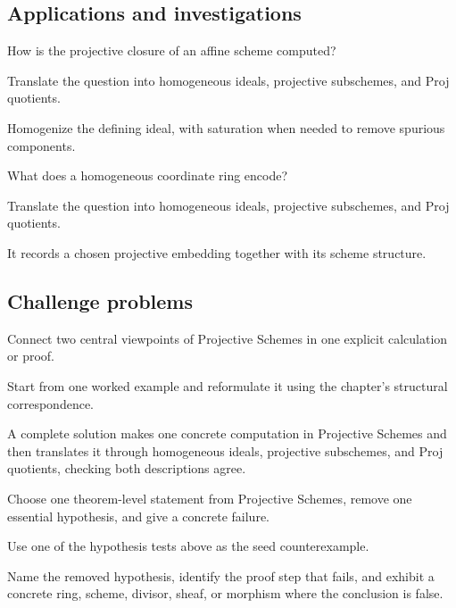 \subsection*{Applications and investigations}

\begin{exercise}\label{exr:vi37-expand-13}
How is the projective closure of an affine scheme computed?
\end{exercise}
\begin{hint}
Translate the question into homogeneous ideals, projective subschemes, and Proj quotients.
\end{hint}
\begin{solution}
Homogenize the defining ideal, with saturation when needed to remove spurious components.
\end{solution}

\begin{exercise}\label{exr:vi37-expand-14}
What does a homogeneous coordinate ring encode?
\end{exercise}
\begin{hint}
Translate the question into homogeneous ideals, projective subschemes, and Proj quotients.
\end{hint}
\begin{solution}
It records a chosen projective embedding together with its scheme structure.
\end{solution}

\subsection*{Challenge problems}

\begin{exercise}\label{exr:vi37-expand-15}
Connect two central viewpoints of Projective Schemes in one explicit calculation or proof.
\end{exercise}
\begin{hint}
Start from one worked example and reformulate it using the chapter's structural correspondence.
\end{hint}
\begin{solution}
A complete solution makes one concrete computation in Projective Schemes and then translates it through homogeneous ideals, projective subschemes, and Proj quotients, checking both descriptions agree.
\end{solution}

\begin{exercise}\label{exr:vi37-expand-16}
Choose one theorem-level statement from Projective Schemes, remove one essential hypothesis, and give a concrete failure.
\end{exercise}
\begin{hint}
Use one of the hypothesis tests above as the seed counterexample.
\end{hint}
\begin{solution}
Name the removed hypothesis, identify the proof step that fails, and exhibit a concrete ring, scheme, divisor, sheaf, or morphism where the conclusion is false.
\end{solution}

